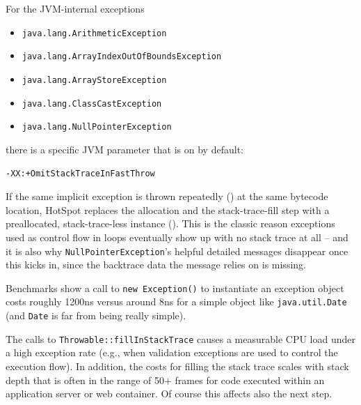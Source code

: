 \begin{enumerate}
{	For the JVM-internal exceptions
	\begin{itemize}[nosep]
		\item{\lstinline|java.lang.ArithmeticException| \autocite{ORACLE_DOC_ARITHMETICEXCEPTION_CLASS}}
		\item{\lstinline|java.lang.ArrayIndexOutOfBoundsException| \autocite{ORACLE_DOC_ARRAYINDEXOUTOFBOUNDSEXCEPTION_CLASS}}
		\item{\lstinline|java.lang.ArrayStoreException| \autocite{ORACLE_DOC_ARRAYSTOREEXCEPTION_CLASS}}
		\item{\lstinline|java.lang.ClassCastException| \autocite{ORACLE_DOC_CLASSCASTEXCEPTION_CLASS}}
		\item{\lstinline|java.lang.NullPointerException| \autocite{ORACLE_DOC_NULLPOINTEREXCEPTION_CLASS}}
	\end{itemize}
	there is a specific  JVM parameter that is on by default:
	\begin{center}
		\texttt{\mbox{-XX:+OmitStackTraceInFastThrow}}  
	\end{center}
	If the same implicit exception is thrown repeatedly () at the same bytecode location, HotSpot replaces the allocation and the stack-trace-fill step with a preallocated, stack-trace-less instance (). This is the classic reason exceptions used as control flow in loops eventually show up with no stack trace at all – and it is also why \lstinline|NullPointerException|'s helpful detailed messages disappear once this kicks in, since the backtrace data the message relies on is missing.
	
Benchmarks show a call to \lstinline|new Exception()| to instantiate an exception object costs roughly 1200ns versus around 8ns for a simple object like \lstinline|java.util.Date| (and \lstinline|Date| is far from being really simple).
	
The calls to \lstinline|Throwable::fillInStackTrace| causes a measurable CPU load under a high exception rate (e.g., when validation exceptions are used to control the execution flow). In addition, the costs for filling the stack trace scales with stack depth that is often in the range of \mbox{50+} frames for code executed within an application server or web container. Of course this affects also the next step.}
	

\end{enumerate}
